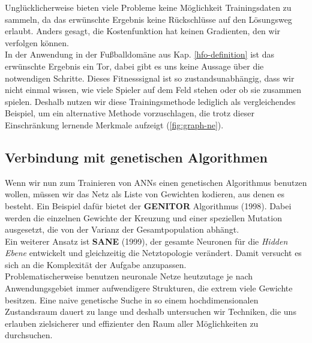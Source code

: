             \noindent
            Unglücklicherweise bieten viele Probleme keine Möglichkeit Trainingsdaten zu sammeln, da das erwünschte Ergebnis keine Rückschlüsse auf den Lösungsweg erlaubt. Anders gesagt, die Kostenfunktion hat keinen Gradienten, den wir verfolgen können. \\ 

            \noindent
            In der Anwendung in der Fußballdomäne aus Kap. \ref{hfo-definition} ist das erwünschte Ergebnis ein Tor, dabei gibt es uns keine Aussage über die notwendigen Schritte. Dieses Fitnesssignal ist so zustandsunabhängig, dass wir nicht einmal wissen, wie viele Spieler auf dem Feld stehen oder ob sie zusammen spielen. Deshalb nutzen wir diese Trainingsmethode lediglich als vergleichendes Beispiel, um ein alternative Methode vorzuschlagen, die trotz dieser Einschränkung lernende Merkmale aufzeigt (\ref{fig:graph-ne}).

        \subsection{Verbindung mit genetischen Algorithmen}
            Wenn wir nun zum Trainieren von ANNs einen genetischen Algorithmus benutzen wollen, müssen wir das Netz als Liste von Gewichten kodieren, aus denen es besteht. Ein Beispiel dafür bietet der \textbf{GENITOR} \cite{moriarty1999evolutionary} Algorithmus (1998). Dabei werden die einzelnen Gewichte der Kreuzung und einer speziellen Mutation ausgesetzt, die von der Varianz der Gesamtpopulation abhängt. \\

            \noindent
            Ein weiterer Ansatz ist \textbf{SANE} \cite{moriarty1999evolutionary} (1999), der gesamte Neuronen für die \textit{Hidden Ebene} entwickelt und gleichzeitig die Netztopologie verändert. Damit versucht es sich an die Komplexität der Aufgabe anzupassen. \\ %

            \noindent
            Problematischerweise benutzen neuronale Netze heutzutage je nach Anwendungsgebiet immer aufwendigere Strukturen, die extrem viele Gewichte besitzen. Eine naive genetische Suche in so einem hochdimensionalen Zustandsraum dauert zu lange und deshalb untersuchen wir Techniken, die uns erlauben zielsicherer und effizienter den Raum aller Möglichkeiten zu durchsuchen. 

